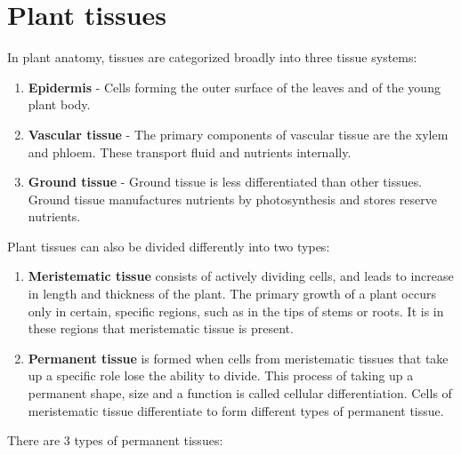 \documentclass[]{book}
\providecommand{\tightlist}{%
  \setlength{\itemsep}{0pt}\setlength{\parskip}{0pt}}
\theoremstyle{definition}
\theoremstyle{definition}
\theoremstyle{definition}
\theoremstyle{remark}
\begin{document}
\section{Plant tissues}\label{plant-tissues}

In plant anatomy, tissues are categorized broadly into three tissue
systems:

\begin{enumerate}
\def\labelenumi{\arabic{enumi}.}
\tightlist
\item
  \textbf{Epidermis} - Cells forming the outer surface of the leaves and
  of the young plant body.
\item
  \textbf{Vascular tissue} - The primary components of vascular tissue
  are the xylem and phloem. These transport fluid and nutrients
  internally.
\item
  \textbf{Ground tissue} - Ground tissue is less differentiated than
  other tissues. Ground tissue manufactures nutrients by photosynthesis
  and stores reserve nutrients.
\end{enumerate}

Plant tissues can also be divided differently into two types:

\begin{enumerate}
\def\labelenumi{\arabic{enumi}.}
\tightlist
\item
  \textbf{Meristematic tissue} consists of actively dividing cells, and
  leads to increase in length and thickness of the plant. The primary
  growth of a plant occurs only in certain, specific regions, such as in
  the tips of stems or roots. It is in these regions that meristematic
  tissue is present.
\item
  \textbf{Permanent tissue} is formed when cells from meristematic
  tissues that take up a specific role lose the ability to divide. This
  process of taking up a permanent shape, size and a function is called
  cellular differentiation. Cells of meristematic tissue differentiate
  to form different types of permanent tissue.
\end{enumerate}

There are 3 types of permanent tissues:
\end{document}
